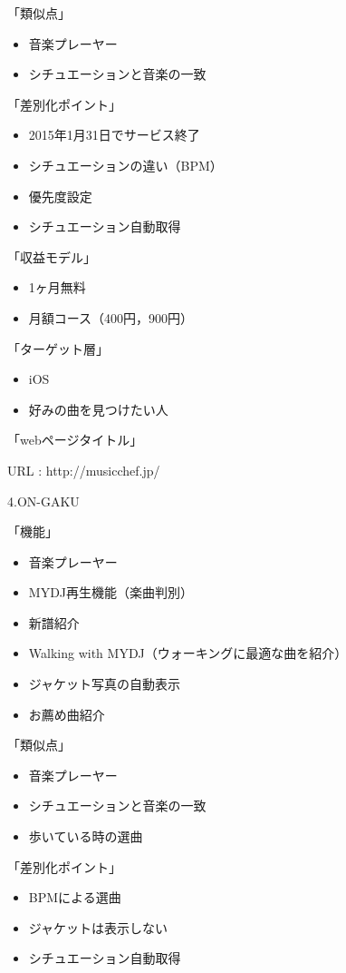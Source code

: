 「類似点」
\begin{itemize}
\item 音楽プレーヤー
\item シチュエーションと音楽の一致
\end{itemize}

「差別化ポイント」
\begin{itemize}
\item 2015年1月31日でサービス終了
\item シチュエーションの違い（BPM）
\item 優先度設定
\item シチュエーション自動取得
\end{itemize}

「収益モデル」
\begin{itemize}
\item 1ヶ月無料
\item 月額コース（400円，900円）
\end{itemize}

「ターゲット層」
\begin{itemize}
\item iOS
\item 好みの曲を見つけたい人
\end{itemize}

「webページタイトル」
\par
URL : http://musicchef.jp/

\par
4.ON-GAKU
\par
「機能」
\begin{itemize}
\item 音楽プレーヤー
\item MYDJ再生機能（楽曲判別）
\item 新譜紹介
\item Walking with MYDJ（ウォーキングに最適な曲を紹介）
\item ジャケット写真の自動表示
\item お薦め曲紹介
\end{itemize}

「類似点」
\begin{itemize}
\item 音楽プレーヤー
\item シチュエーションと音楽の一致
\item 歩いている時の選曲
\end{itemize}

「差別化ポイント」
\begin{itemize}
\item BPMによる選曲
\item ジャケットは表示しない
\item シチュエーション自動取得
\end{itemize}

